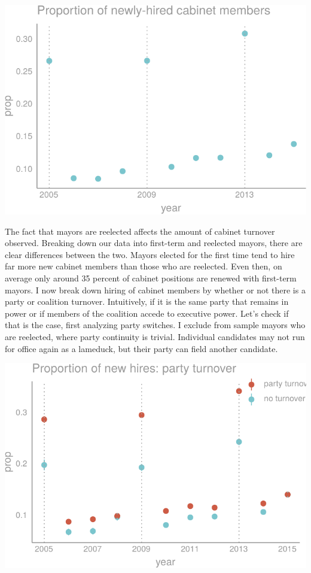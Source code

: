 \documentclass[12pt,]{article}
\begin{document}
\begin{center}\includegraphics{dissertation_files/figure-latex/new-hires-1} \end{center}

The fact that mayors are reelected affects the amount of cabinet
turnover observed. Breaking down our data into first-term and reelected
mayors, there are clear differences between the two. Mayors elected for
the first time tend to hire far more new cabinet members than those who
are reelected. Even then, on average only around 35 percent of cabinet
positions are renewed with first-term mayors. I now break down hiring of
cabinet members by whether or not there is a party or coalition
turnover. Intuitively, if it is the same party that remains in power or
if members of the coalition accede to executive power. Let's check if
that is the case, first analyzing party switches. I exclude from sample
mayors who are reelected, where party continuity is trivial. Individual
candidates may not run for office again as a lameduck, but their party
can field another candidate.

\begin{center}\includegraphics{dissertation_files/figure-latex/party turnover-1} \end{center}
\end{document}

